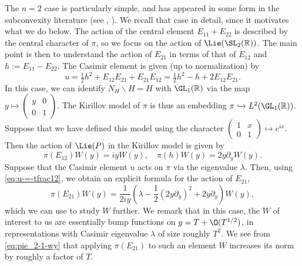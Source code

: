 The $n=2$ case is particularly simple, and has appeared in some form in the subconvexity literature (see \cite[Lemma 8.4]{venkatesh-2005}, \cite[\S3.2.5]{michel-2009}).  We recall that case in detail, since it motivates what we do below.  The action of the central element $E_{1 1} + E_{2 2}$ is described by the central character of $\pi$, so we focus on the action of $\Lie(\SL_2(\mathbb{R}))$.  The main point is then to understand the action of $E_{2 1}$ in terms of that of $E_{12}$ and $h := E_{1 1} - E_{2 2}$.  The Casimir element is given (up to normalization) by
\begin{equation}\label{eq:u-=-tfrac12}
  u = \tfrac{1}{2} h^2 + E_{12} E_{21} + E_{2 1} E_{1 2}
  =\tfrac{1}{2}  h^2 - h + 2 E_{12} E_{21}.
\end{equation}
In this case, we can identify $N_H \backslash H = H$ with $\GL_1(\mathbb{R})$ via the map $y \mapsto \begin{pmatrix}
  y & 0 \\
  0 & 1
\end{pmatrix}$.  The Kirillov model of $\pi$ is thus an embedding $\pi \hookrightarrow L^2(\GL_1(\mathbb{R}))$.  Suppose that we have defined this model using the character $\begin{pmatrix}
  1 & x \\
  0 & 1
\end{pmatrix} \mapsto e^{i x}$.  Then the action of $\Lie(P)$ in the Kirillov model is given by
\begin{equation*}
  \pi(E_{12}) W(y) = i y W(y),
  \quad
  \pi(h) W(y) = 2 y \partial_y W(y).
\end{equation*}
Suppose that the Casimir element $u$ acts on $\pi$ via the eigenvalue $\lambda$.  Then, using \eqref{eq:u-=-tfrac12}, we obtain an explicit formula for the action of $E_{2 1}$,
\begin{equation}\label{eq:pie_2-1-wy}
  \pi(E_{2 1}) W(y) =
  \frac{1}{ 2 i y} \left(
    \lambda - \frac{1}{2} (2 y \partial_y)^2 + 2 y \partial_y
  \right) W(y),
\end{equation}
which we can use to study $W$ further.  We remark that in this case, the $W$ of interest to us are essentially bump functions on $y = T + \O(T^{1/2})$, in representations with Casimir eigenvalue $\lambda$ of size roughly $T^2$.  We see from \eqref{eq:pie_2-1-wy} that applying $\pi(E_{21 })$ to such an element $W$ increases its norm by roughly a factor of $T$.


